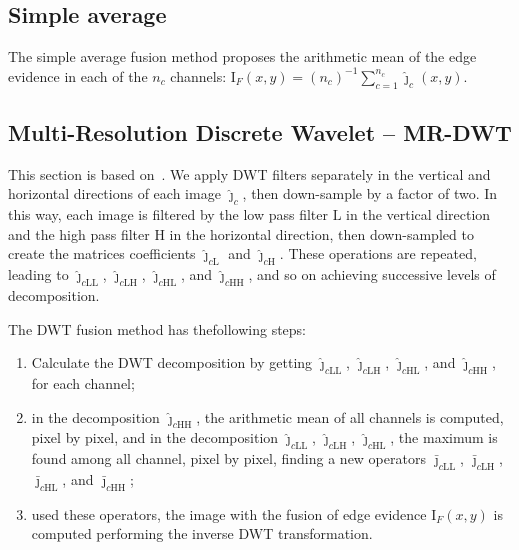\documentclass[journal]{IEEEtran}
\begin{document}

\subsection{Simple average}
The simple average fusion method proposes the arithmetic mean of the edge evidence in each of the $n_c$ channels:
$\text{I}_F(x,y)=(n_c)^{-1}\sum_{c=1}^{n_c} \widehat{\bm\jmath}_c(x,y)$.

\subsection{Multi-Resolution Discrete Wavelet -- MR-DWT} 
This section is based on~\cite{n_r}.
We apply DWT filters separately in the vertical and horizontal directions of each image $\bm{\widehat\jmath}_c$, then down-sample by a factor of two. 
In this way, each image is filtered by the low pass filter $\text{L}$ in the vertical direction and the high pass filter $\text{H}$ in the horizontal direction, then down-sampled to create the matrices coefficients  $\bm{\widehat\jmath}_{c\text{L}}$ and $\bm{\widehat\jmath}_{c\text{H}}$. 
These operations are repeated, leading to $\bm{\widehat\jmath}_{c\text{LL}}$, $\bm{\widehat\jmath}_{c\text{LH}}$, $\bm{\widehat\jmath}_{c\text{HL}}$, and $\bm{\widehat\jmath}_{c\text{HH}}$, and so on achieving successive levels of decomposition.

The DWT fusion method has thefollowing steps:
\begin{enumerate}
\item Calculate the DWT decomposition by getting $\widehat\jmath_{c\text{LL}}$, $\widehat\jmath_{c\text{LH}}$, $\widehat\jmath_{c\text{HL}}$, and $\widehat\jmath_{c\text{HH}}$, for each channel;
\item in the decomposition $\widehat\jmath_{c\text{HH}}$, the arithmetic mean of all channels is computed, pixel by pixel, and in the decomposition $\widehat\jmath_{c\text{LL}}$, $\widehat\jmath_{c\text{LH}}$, $\widehat\jmath_{c\text{HL}}$, the maximum is found among all channel, pixel by pixel, finding a new operators $\bar\jmath_{c\text{LL}}$, $\bar\jmath_{c\text{LH}}$, $\bar\jmath_{c\text{HL}}$, and $\bar\jmath_{c\text{HH}}$;
\item used these operators, the image with the fusion of edge evidence $\text{I}_F(x, y)$ is computed performing the inverse DWT transformation.
\end{enumerate}
\end{document}
